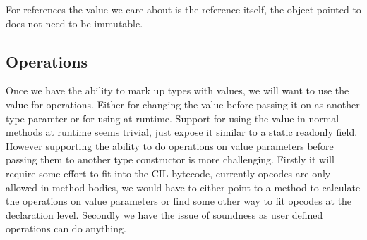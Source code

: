 \documentclass[english]{report}
\begin{document}
For references the value we care about is the reference itself, the object pointed to does not need to be immutable.

\subsection{Operations}

Once we have the ability to mark up types with values, we will want
to use the value for operations. Either for changing the value before
passing it on as another type paramter or for using at runtime. Support
for using the value in normal methods at runtime seems trivial, just
expose it similar to a static readonly field. However supporting the
ability to do operations on value parameters before passing them to
another type constructor is more challenging. Firstly it will require
some effort to fit into the CIL bytecode, currently opcodes are only
allowed in method bodies, we would have to either point to a method
to calculate the operations on value parameters or find some other
way to fit opcodes at the declaration level. Secondly we have the
issue of soundness as user defined operations can do anything.







\end{document}
